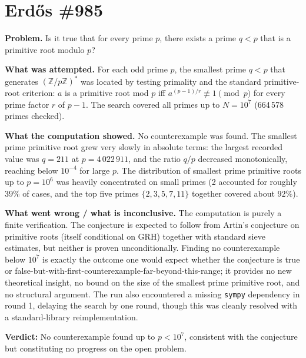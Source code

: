 \section{Erdős \#985}

\textbf{Problem.} Is it true that for every prime $p$, there exists a prime $q < p$ that is a primitive root modulo $p$?

\textbf{What was attempted.} For each odd prime $p$, the smallest prime $q < p$ that generates $(\mathbb{Z}/p\mathbb{Z})^*$ was located by testing primality and the standard primitive-root criterion: $a$ is a primitive root mod $p$ iff $a^{(p-1)/r} \not\equiv 1 \pmod{p}$ for every prime factor $r$ of $p-1$. The search covered all primes up to $N = 10^7$ (664\,578 primes checked).

\textbf{What the computation showed.} No counterexample was found. The smallest prime primitive root grew very slowly in absolute terms: the largest recorded value was $q = 211$ at $p = 4\,022\,911$, and the ratio $q/p$ decreased monotonically, reaching below $10^{-4}$ for large $p$. The distribution of smallest prime primitive roots up to $p = 10^6$ was heavily concentrated on small primes (2 accounted for roughly $39\%$ of cases, and the top five primes $\{2,3,5,7,11\}$ together covered about $92\%$).

\textbf{What went wrong / what is inconclusive.} The computation is purely a finite verification. The conjecture is expected to follow from Artin's conjecture on primitive roots (itself conditional on GRH) together with standard sieve estimates, but neither is proven unconditionally. Finding no counterexample below $10^7$ is exactly the outcome one would expect whether the conjecture is true or false-but-with-first-counterexample-far-beyond-this-range; it provides no new theoretical insight, no bound on the size of the smallest prime primitive root, and no structural argument. The run also encountered a missing \texttt{sympy} dependency in round 1, delaying the search by one round, though this was cleanly resolved with a standard-library reimplementation.

\textbf{Verdict:} No counterexample found up to $p < 10^7$, consistent with the conjecture but constituting no progress on the open problem.